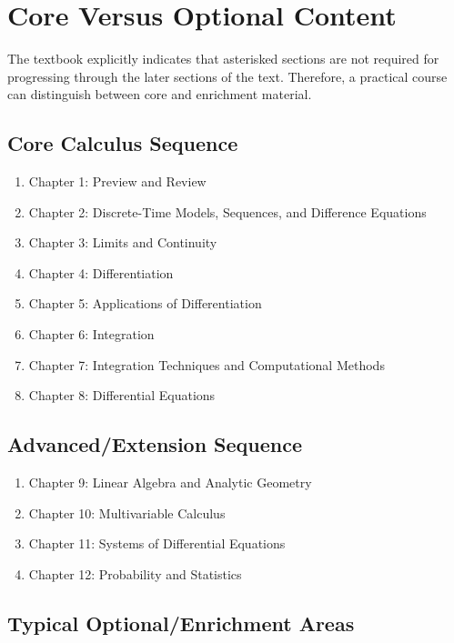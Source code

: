 \documentclass[11pt]{article}
\begin{document}

\section{Core Versus Optional Content}

The textbook explicitly indicates that asterisked sections are not
required for progressing through the later sections of the text.
Therefore, a practical course can distinguish between core and
enrichment material.

\subsection{Core Calculus Sequence}

\begin{enumerate}
    \item Chapter 1: Preview and Review
    \item Chapter 2: Discrete-Time Models, Sequences, and Difference
    Equations
    \item Chapter 3: Limits and Continuity
    \item Chapter 4: Differentiation
    \item Chapter 5: Applications of Differentiation
    \item Chapter 6: Integration
    \item Chapter 7: Integration Techniques and Computational Methods
    \item Chapter 8: Differential Equations
\end{enumerate}

\subsection{Advanced/Extension Sequence}

\begin{enumerate}
    \item Chapter 9: Linear Algebra and Analytic Geometry
    \item Chapter 10: Multivariable Calculus
    \item Chapter 11: Systems of Differential Equations
    \item Chapter 12: Probability and Statistics
\end{enumerate}

\subsection{Typical Optional/Enrichment Areas}
\end{document}
